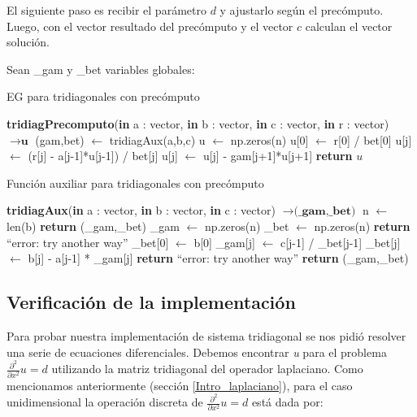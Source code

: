 El siguiente paso es recibir el parámetro $d$ y ajustarlo según el precómputo. Luego, con el vector resultado del precómputo y el vector $c$ calculan el vector solución.

Sean \_gam y \_bet variables globales:

\begin{algorithm}[H]
\caption{EG para tridiagonales con precómputo}\label{tridiagonal_prec}
\begin{algorithmic}
\State \textbf{tridiagPrecomputo}(\textbf{in} a : vector, \textbf{in} b : vector, \textbf{in} c : vector, \textbf{in} r : vector) $\to \textbf{u}$
\State (gam,bet) $\gets$ tridiagAux(a,b,c)
\State u $\gets$ np.zeros(n)
\State u[0] $\gets$ r[0] / bet[0]
    \State u[j] $\gets$ (r[j] - a[j-1]*u[j-1]) / bet[j]
\EndFor
{}
    \State u[j] $\gets$ u[j] -  gam[j+1]*u[j+1]
\EndFor
\State \textbf{return} $u$
\end{algorithmic}
\end{algorithm}

\begin{algorithm}[H]
\caption{Función auxiliar para tridiagonales con precómputo}
\begin{algorithmic}
\State \textbf{tridiagAux}(\textbf{in} a : vector, \textbf{in} b : vector, \textbf{in} c : vector) $\to \textbf{(\_gam,\_bet)}$
\State n $\gets$ len(b)
    \State \textbf{return} (\_gam,\_bet)
\EndIf
\State \_gam $\gets$ np.zeros(n)
\State \_bet $\gets$ np.zeros(n)
    \State \textbf{return} ``error: try another way''
\EndIf
\State \_bet[0] $\gets$ b[0]
    \State \_gam[j] $\gets$ c[j-1] / \_bet[j-1]
    \State \_bet[j] $\gets$ b[j] - a[j-1] * \_gam[j]
        \State \textbf{return} ``error: try another way''
    \EndIf
\EndFor
\State \textbf{return} (\_gam,\_bet)
\end{algorithmic}
\end{algorithm}

\subsection{Verificación de la implementación}
Para probar nuestra implementación de sistema tridiagonal se nos pidió resolver una serie de ecuaciones diferenciales. Debemos encontrar \textit{u} para el problema $\frac{\partial^2}{\partial x^2}u = d$ utilizando la matriz tridiagonal del operador laplaciano.
Como mencionamos anteriormente (sección \ref{Intro_laplaciano}), para el caso unidimensional la operación discreta de $\frac{\partial^2}{\partial x^2}u = d$ está dada por:

